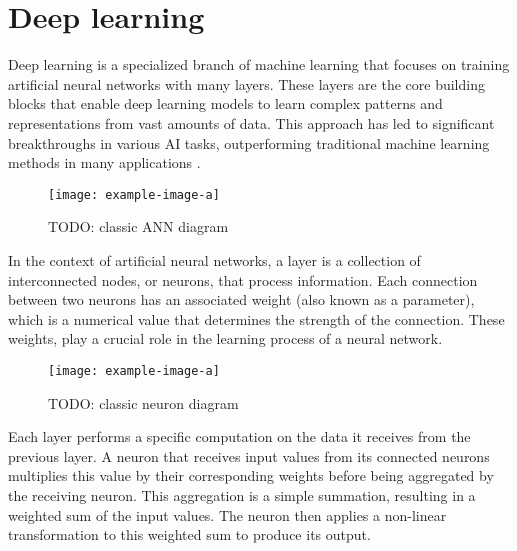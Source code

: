 \section{Deep learning}
Deep learning is a specialized branch of machine learning that focuses on training artificial neural networks with many layers.
These layers are the core building blocks that enable deep learning models to learn complex patterns and representations from vast amounts of data.
This approach has led to significant breakthroughs in various AI tasks, outperforming traditional machine learning methods in many applications \cite{}.

\begin{figure}[hbtp]
    \centering    
    \texttt{[image: example-image-a]}
    \caption{TODO: classic ANN diagram}
\end{figure}

In the context of artificial neural networks, a layer is a collection of interconnected nodes, or neurons, that process information.
Each connection between two neurons has an associated weight (also known as a parameter), which is a numerical value that determines the strength of the connection.
These weights, play a crucial role in the learning process of a neural network.

\begin{figure}[hbtp]
    \centering    
    \texttt{[image: example-image-a]}
    \caption{TODO: classic neuron diagram}
\end{figure}

Each layer performs a specific computation on the data it receives from the previous layer.
A neuron that receives input values from its connected neurons multiplies this value by their corresponding weights before being aggregated by the receiving neuron.
This aggregation is a simple summation, resulting in a weighted sum of the input values.
The neuron then applies a non-linear transformation to this weighted sum to produce its output.

